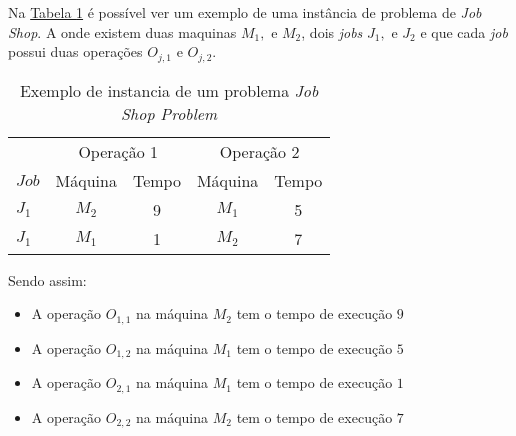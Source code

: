     Na 
    \hyperref[fig:ex-instancia-problema-JSP]{Tabela \ref{fig:ex-instancia-problema-JSP}}
    é possível ver um exemplo de uma instância de problema de \textit{Job Shop}. 
    A onde existem duas maquinas $M_1, $ e $M_2$, 
    dois \textit{jobs} $J_1, $ e $J_2$ 
    e que cada \textit{job} possui 
    duas operações $O_{j,1} $ e $O_{j,2}$.
    
\begin{table}[htb]
    \centering
    \caption{Exemplo de instancia de um problema \textit{Job Shop Problem}}
    \label{fig:ex-instancia-problema-JSP}
    \begin{tabular}[t]{lcccc}
        \hline
        &\multicolumn{2}{c}{Operação 1}&\multicolumn{2}{c}{Operação 2}\\
        $Job$&Máquina&Tempo&Máquina&Tempo\\
        \hline
        $J_1$&$M_2$&9&$M_1$&5\\
        $J_1$&$M_1$&1&$M_2$&7\\
        \hline
    \end{tabular}
\end{table}

            \noindent Sendo assim:\hfill
            \begin{itemize}
                \item A operação $O_{1,1}$ na máquina $M_2$ tem o tempo de execução $9$
                \item A operação $O_{1,2}$ na máquina $M_1$ tem o tempo de execução $5$
                \item A operação $O_{2,1}$ na máquina $M_1$ tem o tempo de execução $1$
                \item A operação $O_{2,2}$ na máquina $M_2$ tem o tempo de execução $7$
            \end{itemize}
            



